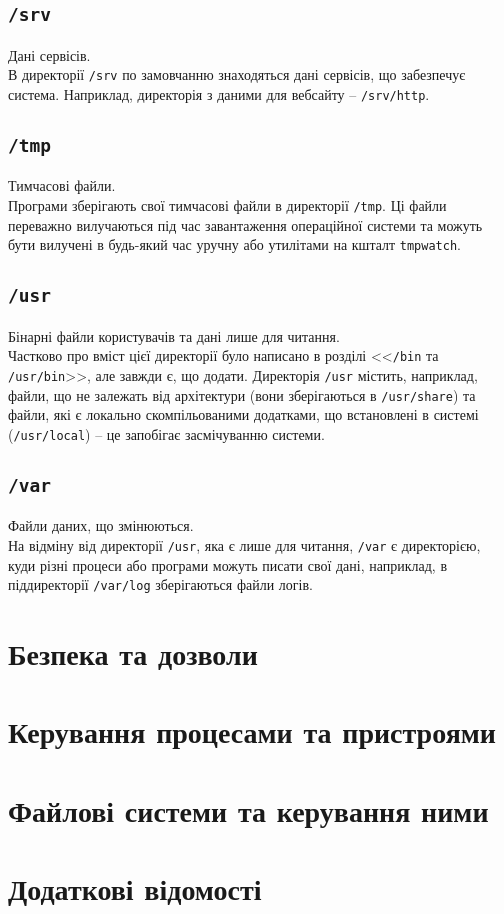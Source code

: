 \documentclass[10pt,a4paper]{fancyhandout}
\begin{document}
	\subsection{\texttt{/srv}}
	Дані сервісів. \\
	В директорії \texttt{/srv} по замовчанню знаходяться дані сервісів, що забезпечує система. Наприклад, директорія з даними для вебсайту -- \texttt{/srv/http}.
	\goodbreak
	
	\subsection{\texttt{/tmp}}
	Тимчасові файли. \\
	Програми зберігають свої тимчасові файли в директорії \texttt{/tmp}. Ці файли переважно вилучаються під час завантаження операційної системи та можуть бути вилучені в будь-який час уручну або утилітами на кшталт \texttt{tmpwatch}.
	\goodbreak
	
	\subsection{\texttt{/usr}}
	Бінарні файли користувачів та дані лише для читання. \\
	Частково про вміст цієї директорії було написано в розділі <<\texttt{/bin} та \texttt{/usr/bin}>>, але завжди є, що додати. Директорія \texttt{/usr} містить, наприклад, файли, що не залежать від архітектури (вони зберігаються в \texttt{/usr/share}) та файли, які є локально скомпільованими додатками, що встановлені в системі (\texttt{/usr/local}) -- це запобігає засмічуванню системи.
	\goodbreak
	
	\subsection{\texttt{/var}}
	Файли даних, що змінюються. \\
	На відміну від директорії \texttt{/usr}, яка є лише для читання, \texttt{/var} є директорією, куди різні процеси або програми можуть писати свої дані, наприклад, в піддиректорії \texttt{/var/log} зберігаються файли логів.
	\goodbreak
	
\section{Безпека та дозволи} \label{Безпека та дозволи}

\section{Керування процесами та пристроями}
\section{Файлові системи та керування ними}
\section{Додаткові відомості}
\tableofcontents
\doclicenseThis
\end{document}
